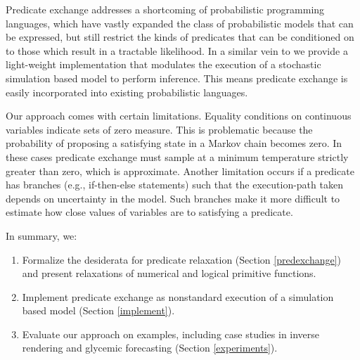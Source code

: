 Predicate exchange addresses a shortcoming of probabilistic programming languages,
which have vastly expanded the class of probabilistic models that can be expressed, but still restrict the kinds of predicates that can be conditioned on to those which result in a tractable likelihood.
In a similar vein to  \cite{wingate2011lightweight} we provide a light-weight implementation that modulates the execution of a stochastic simulation based model to perform inference.
This means predicate exchange is easily incorporated into existing probabilistic languages. 

Our approach comes with certain limitations.
Equality conditions on continuous variables indicate sets of zero measure.
This is problematic because the probability of proposing a satisfying state in a Markov chain becomes zero.
In these cases predicate exchange must sample at a minimum temperature strictly greater than zero, which is approximate.
Another limitation occurs if a predicate has branches (e.g., if-then-else statements) such that the execution-path taken depends on uncertainty in the model.
Such branches make it more difficult to estimate how close values of variables are to satisfying a predicate.

In summary, we:

\begin{enumerate}
	\item Formalize the desiderata for predicate relaxation (Section \ref{predexchange}) and present relaxations of numerical and logical primitive functions.
	\item Implement predicate exchange as nonstandard execution of a simulation based model (Section \ref{implement}).
	\item Evaluate our approach on examples, including case studies in inverse rendering and glycemic forecasting (Section \ref{experiments}).
\end{enumerate}



